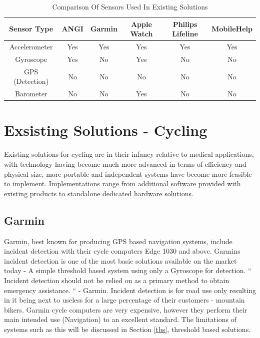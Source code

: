 \begin{table}
\caption{Comparison Of Sensors Used In Existing Solutions}
\label{sen}
\begin{center}

 \begin{tabular}{||c| c| c|  c| c| c||} 

 \hline
 Sensor Type & ANGI & Garmin & Apple Watch & Philips Lifeline & MobileHelp\\ [0.5ex] 
 \hline\hline
 Accelerometer & Yes & Yes & Yes & Yes & Yes \\ 
 \hline
Gyroscope & Yes& No & Yes & No & No \\ 
 \hline
GPS (Detection) & No & No & No & No &No\\ 
 \hline
Barometer & No & No & Yes & No&No\\ [1ex] 

 \hline
\end{tabular}
\end{center}
\end{table}





\section{Exsisting Solutions - Cycling}

Existing solutions for cycling are in their infancy relative to medical applications, with technology having become much more advanced in terms of efficiency and physical size, more portable and independent systems have become more feasible to implement. Implementations range from additional software provided with existing products to standalone dedicated hardware solutions.



\subsection{Garmin}
Garmin, best known for producing GPS based navigation systems, include incident detection with their cycle computers Edge 1030 and above. Garmins incident detection is one of the most basic solutions available on the market today - A simple threshold based system using only a Gyroscope for detection.   “ Incident detection should not be relied on as a primary method to obtain emergency assistance. “ - Garmin. Incident detection is for road use only resulting in it being next to useless for a  large percentage of their customers - mountain bikers. Garmin cycle computers are very expensive, however they perform their main intended use (Navigation) to an excellent standard.  The limitations of systems such as this will be discussed in Section \ref{tbs}, threshold based solutions.


